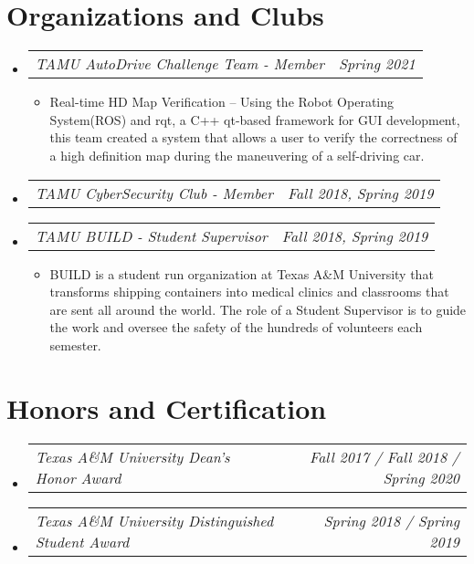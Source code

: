 \documentclass[letterpaper,11pt]{article}
\makeatletter
\newcommand{\resumeAward}[2]{
  \vspace{-1pt}
    \item\begin{tabular*}{0.97\textwidth}{l@{\extracolsep{\fill}}r}
    \textit{\small#1} & \textit{\small #2} \\
    \end{tabular*}\vspace{-20pt}
}
\newcommand{\resumeJobDesc}[1]{
  \item\small{{ #1 \vspace{-2pt}}
  }
}
\newcommand{\resumeSubHeadingListStart}{\begin{itemize}[leftmargin=*]}
\newcommand{\resumeSubHeadingListEnd}{\end{itemize}}
\newcommand{\resumeItemListStart}{\begin{itemize}}
\newcommand{\resumeItemListEnd}{\end{itemize}\vspace{-5pt}}
\makeatother
\begin{document}
\section{Organizations and Clubs}
\resumeSubHeadingListStart
        \resumeAward{TAMU AutoDrive Challenge Team - Member}{Spring 2021}
         \vspace{0pt}
        \resumeItemListStart
                \resumeJobDesc{Real-time HD Map Verification -- Using the Robot Operating System(ROS) and rqt, a C++ qt-based framework for GUI development, this team created a system that allows a user to verify the correctness of a high definition map during the maneuvering of a self-driving car. }
        \resumeItemListEnd
        \resumeAward{TAMU CyberSecurity Club - Member}{Fall 2018, Spring 2019}
        \resumeAward{TAMU BUILD - Student Supervisor}{Fall 2018, Spring 2019}
        \vspace{0pt} %
        \resumeItemListStart
                \resumeJobDesc{BUILD is a student run organization at Texas A\&M University that transforms shipping containers into medical clinics and classrooms that are sent all around the world. The role of a Student Supervisor is to guide the work and oversee the safety of the hundreds of volunteers each semester.}
        \resumeItemListEnd
\resumeSubHeadingListEnd

\section{Honors and Certification}
  \resumeSubHeadingListStart
    \resumeAward{Texas A\&M University Dean's Honor Award}{Fall 2017 / Fall 2018 / Spring 2020}
    \resumeAward{Texas A\&M University Distinguished Student Award}{Spring 2018 / Spring 2019}
\resumeSubHeadingListEnd
\end{document}
